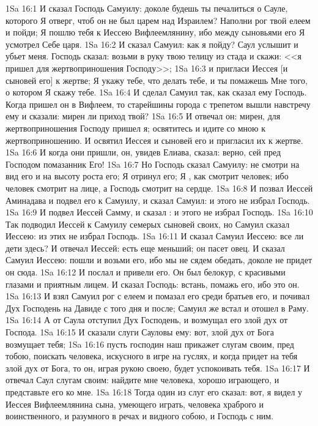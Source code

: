 \vs 1Sa 16:1 И сказал Господь Самуилу: доколе будешь ты печалиться о Сауле, которого Я отверг, чтоб он не был царем над Израилем? Наполни рог твой елеем и пойди; Я пошлю тебя к Иессею Вифлеемлянину, ибо между сыновьями его Я усмотрел Себе царя.
\vs 1Sa 16:2 И сказал Самуил: как я пойду? Саул услышит и убьет меня. Господь сказал: возьми в руку твою телицу из стада и скажи: <<я пришел для жертвоприношения Господу>>;
\vs 1Sa 16:3 и пригласи Иессея [и сыновей его] к жертве; Я укажу тебе, что делать тебе, и ты помажешь Мне того, о котором Я скажу тебе.
\vs 1Sa 16:4 И сделал Самуил так, как сказал ему Господь. Когда пришел он в Вифлеем, то старейшины города с трепетом вышли навстречу ему и сказали: мирен ли приход твой?
\vs 1Sa 16:5 И отвечал он: мирен, для жертвоприношения Господу пришел я; освятитесь и идите со мною к жертвоприношению. И освятил Иессея и сыновей его и пригласил их к жертве.
\vs 1Sa 16:6 И когда они пришли, он, увидев Елиава, сказал: верно, сей пред Господом помазанник Его!
\vs 1Sa 16:7 Но Господь сказал Самуилу: не смотри на вид его и на высоту роста его; Я отринул его; Я , как смотрит человек; ибо человек смотрит на лице, а Господь смотрит на сердце.
\vs 1Sa 16:8 И позвал Иессей Аминадава и подвел его к Самуилу, и сказал Самуил: и этого не избрал Господь.
\vs 1Sa 16:9 И подвел Иессей Самму, и сказал : и этого не избрал Господь.
\vs 1Sa 16:10 Так подводил Иессей к Самуилу семерых сыновей своих, но Самуил сказал Иессею:  из этих не избрал Господь.
\vs 1Sa 16:11 И сказал Самуил Иессею: все ли дети здесь? И отвечал Иессей: есть еще меньший; он пасет овец. И сказал Самуил Иессею: пошли и возьми его, ибо мы не сядем обедать, доколе не придет он сюда.
\vs 1Sa 16:12 И послал  и привели его. Он был белокур, с красивыми глазами и приятным лицем. И сказал Господь: встань, помажь его, ибо это он.
\rsbpar\vs 1Sa 16:13 И взял Самуил рог с елеем и помазал его среди братьев его, и почивал Дух Господень на Давиде с того дня и после; Самуил же встал и отошел в Раму.
\vs 1Sa 16:14 А от Саула отступил Дух Господень, и возмущал его злой дух от Господа.
\vs 1Sa 16:15 И сказали слуги Сауловы ему: вот, злой дух от Бога возмущает тебя;
\vs 1Sa 16:16 пусть господин наш прикажет слугам своим,  пред тобою, поискать человека, искусного в игре на гуслях, и когда придет на тебя злой дух от Бога, то он, играя рукою своею, будет успокоивать тебя.
\vs 1Sa 16:17 И отвечал Саул слугам своим: найдите мне человека, хорошо играющего, и представьте его ко мне.
\vs 1Sa 16:18 Тогда один из слуг его сказал: вот, я видел у Иессея Вифлеемлянина сына, умеющего играть, человека храброго и воинственного, и разумного в речах и видного собою, и Господь с ним.
